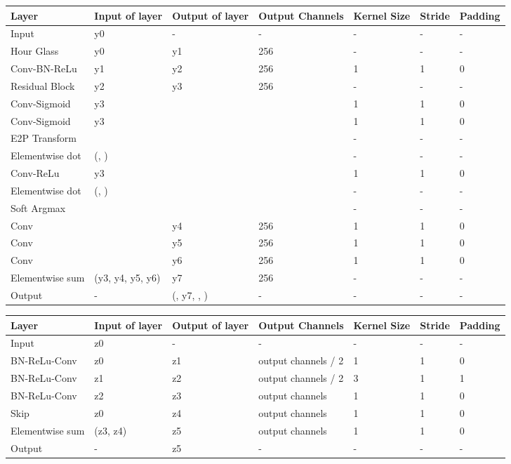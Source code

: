\documentclass[10pt,twocolumn,letterpaper]{article}
\begin{document}
\begin{table*}[htbp]
\begin{subtable}
\centering
\begin{tabular}{|p{0.95in}|p{0.85in}|p{1.5in}|p{1.0in}|p{0.5in}|p{0.5in}|p{0.5in}|}
\hline
Layer & Input of layer & Output of layer & Output Channels & Kernel Size & Stride & Padding \\
\hline
Input & y0 & - & - & - & - & - \\
\hline
Hour Glass~\cite{newell2016stacked} & y0 & y1 & 256 & - & - & - \\
Conv-BN-ReLu & y1 & y2 & 256 & 1 & 1 & 0 \\
Residual Block & y2 & y3 & 256 & - & - & - \\
\hline
Conv-Sigmoid & y3 &  &  & 1 & 1 & 0 \\
Conv-Sigmoid & y3 &  &  & 1 & 1 & 0 \\
E2P Transform &  &  &  & - & - & - \\
Elementwise dot & (, ) &  &  & - & - & - \\
\hline
Conv-ReLu & y3 &  &  & 1 & 1 & 0 \\
Elementwise dot & (, ) &  &  & - & - & - \\
Soft Argmax &  &  &  & - & - & - \\
\hline
Conv &  & y4 & 256 & 1 & 1 & 0 \\
Conv &  & y5 & 256 & 1 & 1 & 0 \\
Conv &  & y6 & 256 & 1 & 1 & 0 \\
Elementwise sum & (y3, y4, y5, y6) & y7 & 256 & - & - & - \\
\hline
Output & - & (, y7, , ) & - & - & - & - \\
\hline
\end{tabular}
\caption{The architecture of head branch.}
\label{table:architecture_head_branches}
\end{subtable}

\hfill
\bigskip
\break

\begin{subtable}
\centering
\begin{tabular}{|p{0.95in}|p{0.85in}|p{1.5in}|p{1.0in}|p{0.5in}|p{0.5in}|p{0.5in}|}
\hline
Layer & Input of layer & Output of layer & Output Channels & Kernel Size & Stride & Padding \\
\hline
Input & z0 & - & - & - & - & - \\
\hline
BN-ReLu-Conv & z0 & z1 & output channels / 2 & 1 & 1 & 0 \\
BN-ReLu-Conv & z1 & z2 & output channels / 2 & 3 & 1 & 1 \\
BN-ReLu-Conv & z2 & z3 & output channels & 1 & 1 & 0 \\
\hline
Skip & z0 & z4 & output channels & 1 & 1 & 0 \\
Elementwise sum & (z3, z4) & z5 & output channels & 1 & 1 & 0 \\
\hline
Output & - & z5 & - & - & - & - \\
\hline
\end{tabular}
\caption{The architecture of residual block. ``output channels'' denotes the channel size of the residual block's output.}
\label{table:architecture_residual_block}
\end{subtable}


\end{table*}
\end{document}
